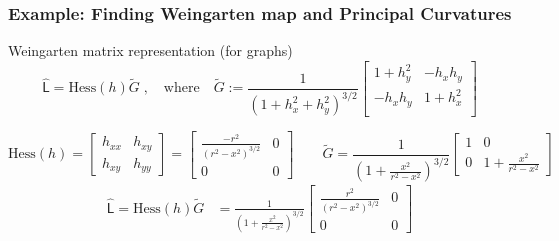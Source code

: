 \documentclass[9pt,notes]{beamer}
\newcommand{\Hess}{\mathrm{Hess}} %
\newcommand{\weinmat}{\widehat{\mathsf{L}}}
\begin{document}
\begin{frame}
\frametitle{Example: Finding Weingarten map and Principal Curvatures}
\begin{block}{Weingarten matrix representation (for graphs)}
\begin{equation*}
\weinmat = \Hess(h) \tilde{G} \;,\quad \mathrm{where} \quad
\tilde{G} := \frac{1}{\left({1+h_x^2 + h_y^2}\right)^{3/2}}
\begin{bmatrix}
1 + h_y^2 & -h_x h_y \\
-h_x h_y & 1 + h_x^2 \\
\end{bmatrix} 
\end{equation*}
\end{block}

\begin{equation*}
\Hess (h)
  = \begin{bmatrix} h_{xx} & h_{xy} \\ h_{xy} & h_{yy} \end{bmatrix}
   = \begin{bmatrix} \frac{-r^2}{\left(r^2 - x^2\right)^{3/2}} & 0 \\ 0 & 0 \end{bmatrix}
\qquad
\tilde{G} =
  \frac{1}{\left(1+\frac{x^2}{r^2-x^2}\right)^{3/2}}
  \begin{bmatrix}
  1 & 0 \\ 0 & 1 + \frac{x^2}{r^2 - x^2}
  \end{bmatrix}
  \end{equation*}
  \begin{align*}
  \weinmat = \Hess(h)\tilde{G}
           &= \frac{1}{\left(1+\frac{x^2}{r^2-x^2}\right)^{3/2}}
              \begin{bmatrix} \frac{r^2}{\left(r^2 - x^2\right)^{3/2}} & 0 \\
              0 & 0 \end{bmatrix} \\

\end{align*}
\end{frame}
\end{document}
